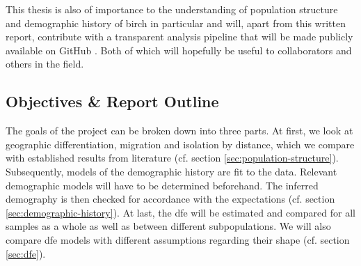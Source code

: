 \documentclass[hidelinks,11pt]{article}
\begin{document}
    This thesis is also of importance to the understanding of population structure and demographic history of birch in particular and will, apart from this written report, contribute with a transparent analysis pipeline that will be made publicly available on GitHub \cite{github-repo}. Both of which will hopefully be useful to collaborators and others in the field.

    \subsection{Objectives \& Report Outline}
    \label{sec:objectives}

    The goals of the project can be broken down into three parts. At first, we look at geographic differentiation, migration and isolation by distance, which we compare with established results from literature (cf. section \ref{sec:population-structure}). Subsequently, models of the demographic history are fit to the data. Relevant demographic models will have to be determined beforehand. The inferred demography is then checked for accordance with the expectations (cf. section \ref{sec:demographic-history}). At last, the \acrfull{dfe} will be estimated and compared for all samples as a whole as well as between different subpopulations. We will also compare \acrshort{dfe} models with different assumptions regarding their shape (cf. section \ref{sec:dfe}).
\end{document}
